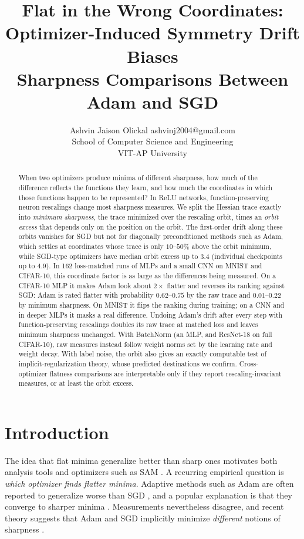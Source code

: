 \documentclass[10pt]{article}
\title{Flat in the Wrong Coordinates:\\ Optimizer-Induced Symmetry Drift Biases\\ Sharpness Comparisons Between Adam and SGD}
\author{\name Ashvin Jaison Olickal \email ashvinj2004@gmail.com \\
      \addr School of Computer Science and Engineering\\
      VIT-AP University}
\theoremstyle{remark}
\begin{document}
\maketitle

\begin{abstract}
When two optimizers produce minima of different sharpness, how much of the difference reflects the functions they learn, and how much the coordinates in which those functions happen to be represented? In ReLU networks, function-preserving neuron rescalings change most sharpness measures. We split the Hessian trace exactly into \emph{minimum sharpness}, the trace minimized over the rescaling orbit, times an \emph{orbit excess} that depends only on the position on the orbit. The first-order drift along these orbits vanishes for SGD but not for diagonally preconditioned methods such as Adam, which settles at coordinates whose trace is only $10$--$50\%$ above the orbit minimum, while SGD-type optimizers have median orbit excess up to $3.4$ (individual checkpoints up to $4.9$). In 162 loss-matched runs of MLPs and a small CNN on MNIST and CIFAR-10, this coordinate factor is as large as the differences being measured. On a CIFAR-10 MLP it makes Adam look about $2\times$ flatter and reverses its ranking against SGD: Adam is rated flatter with probability $0.62$--$0.75$ by the raw trace and $0.01$--$0.22$ by minimum sharpness. On MNIST it flips the ranking during training; on a CNN and in deeper MLPs it masks a real difference. Undoing Adam's drift after every step with function-preserving rescalings doubles its raw trace at matched loss and leaves minimum sharpness unchanged. With BatchNorm (an MLP, and ResNet-18 on full CIFAR-10), raw measures instead follow weight norms set by the learning rate and weight decay. With label noise, the orbit also gives an exactly computable test of implicit-regularization theory, whose predicted destinations we confirm. Cross-optimizer flatness comparisons are interpretable only if they report rescaling-invariant measures, or at least the orbit excess.
\end{abstract}

\section{Introduction}
The idea that flat minima generalize better than sharp ones \citep{hochreiter1997flat,keskar2017large} motivates both analysis tools and optimizers such as SAM \citep{foret2021sam}. A recurring empirical question is \emph{which optimizer finds flatter minima}. Adaptive methods such as Adam \citep{kingma2015adam} are often reported to generalize worse than SGD \citep{wilson2017marginal}, and a popular explanation is that they converge to sharper minima \citep{zhou2020towards}. Measurements nevertheless disagree, and recent theory suggests that Adam and SGD implicitly minimize \emph{different} notions of sharpness \citep{li2025adam}.
\end{document}
